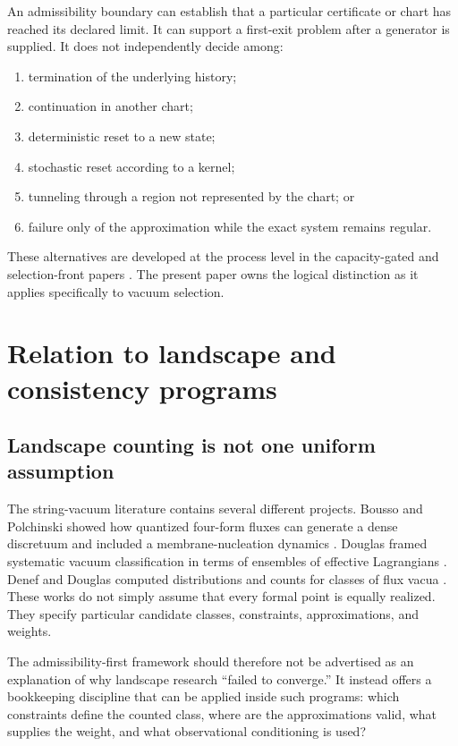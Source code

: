 \documentclass[11pt]{article}
\theoremstyle{definition}
\theoremstyle{remark}
\newcommand{\1}{\mathbf 1}
\begin{document}
An admissibility boundary can establish that a particular certificate or
chart has reached its declared limit.  It can support a first-exit problem
after a generator is supplied.  It does not independently decide among:
\begin{enumerate}[leftmargin=2em]
\item termination of the underlying history;
\item continuation in another chart;
\item deterministic reset to a new state;
\item stochastic reset according to a kernel;
\item tunneling through a region not represented by the chart; or
\item failure only of the approximation while the exact system remains
      regular.
\end{enumerate}
These alternatives are developed at the process level in the
capacity-gated and selection-front papers
\cite{CapacityGated2026,SelectionFronts2026}.  The present paper owns the
logical distinction as it applies specifically to vacuum selection.

\section{Relation to landscape and consistency programs}
\label{sec:landscape}

\subsection{Landscape counting is not one uniform assumption}

The string-vacuum literature contains several different projects.
Bousso and Polchinski showed how quantized four-form fluxes can generate a
dense discretuum and included a membrane-nucleation dynamics
\cite{BoussoPolchinski2000}.  Douglas framed systematic vacuum
classification in terms of ensembles of effective Lagrangians
\cite{Douglas2003}.  Denef and Douglas computed distributions and counts
for classes of flux vacua \cite{DenefDouglas2004}.  These works do not
simply assume that every formal point is equally realized.  They specify
particular candidate classes, constraints, approximations, and weights.

The admissibility-first framework should therefore not be advertised as an
explanation of why landscape research ``failed to converge.''  It instead
offers a bookkeeping discipline that can be applied inside such programs:
which constraints define the counted class, where are the approximations
valid, what supplies the weight, and what observational conditioning is
used?
\end{document}

